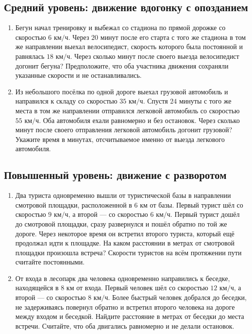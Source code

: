 \documentclass[a4paper,12pt]{article}
\newcommand{\subtopic}[1]{\subsection*{\color{accent}#1}}
\newcommand{\kmh}{\text{ км/ч}}
\newcommand{\kms}{\text{ км}}
\begin{document}
\subtopic{Средний уровень: движение вдогонку с опозданием}
\begin{enumerate}[label=\textbf{\arabic*.},start=4,wide=0pt]
\item Бегун начал тренировку и выбежал со стадиона по прямой дорожке со скоростью $6\kmh$. Через $20$ минут после его старта с того же стадиона в том же направлении выехал велосипедист, скорость которого была постоянной и равнялась $18\kmh$. Через сколько минут после своего выезда велосипедист догонит бегуна? Предположите, что оба участника движения сохраняли указанные скорости и не останавливались.

\item Из небольшого посёлка по одной дороге выехал грузовой автомобиль и направился к складу со скоростью $35\kmh$. Спустя $24$ минуты с того же места в том же направлении отправился легковой автомобиль со скоростью $55\kmh$. Оба автомобиля ехали равномерно и без остановок. Через сколько минут после своего отправления легковой автомобиль догонит грузовой? Укажите время в минутах, отсчитываемое именно от выезда легкового автомобиля.
\end{enumerate}

\subtopic{Повышенный уровень: движение с разворотом}
\begin{enumerate}[label=\textbf{\arabic*.},start=6,wide=0pt]
\item Два туриста одновременно вышли от туристической базы в направлении смотровой площадки, расположенной в $6\kms$ от базы. Первый турист шёл со скоростью $9\kmh$, а второй --- со скоростью $6\kmh$. Первый турист дошёл до смотровой площадки, сразу развернулся и пошёл обратно по той же дороге. Через некоторое время он встретил второго туриста, который ещё продолжал идти к площадке. На каком расстоянии в метрах от смотровой площадки произошла встреча? Скорости туристов на всём протяжении пути считайте постоянными.

\item От входа в лесопарк два человека одновременно направились к беседке, находящейся в $8\kms$ от входа. Первый человек шёл со скоростью $12\kmh$, а второй --- со скоростью $8\kmh$. Более быстрый человек добрался до беседки, не задерживаясь повернул обратно и встретил второго человека на дороге между входом и беседкой. Найдите расстояние в метрах от беседки до места встречи. Считайте, что оба двигались равномерно и не делали остановок.
\end{enumerate}
\end{document}
